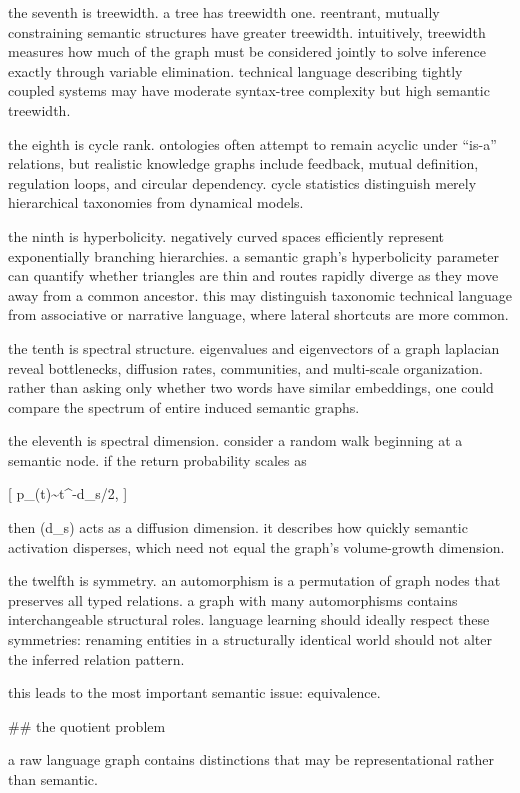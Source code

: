 the seventh is treewidth. a tree has treewidth one. reentrant, mutually constraining semantic structures have greater treewidth. intuitively, treewidth measures how much of the graph must be considered jointly to solve inference exactly through variable elimination. technical language describing tightly coupled systems may have moderate syntax-tree complexity but high semantic treewidth.

the eighth is cycle rank. ontologies often attempt to remain acyclic under “is-a” relations, but realistic knowledge graphs include feedback, mutual definition, regulation loops, and circular dependency. cycle statistics distinguish merely hierarchical taxonomies from dynamical models.

the ninth is hyperbolicity. negatively curved spaces efficiently represent exponentially branching hierarchies. a semantic graph’s hyperbolicity parameter can quantify whether triangles are thin and routes rapidly diverge as they move away from a common ancestor. this may distinguish taxonomic technical language from associative or narrative language, where lateral shortcuts are more common.

the tenth is spectral structure. eigenvalues and eigenvectors of a graph laplacian reveal bottlenecks, diffusion rates, communities, and multi-scale organization. rather than asking only whether two words have similar embeddings, one could compare the spectrum of entire induced semantic graphs.

the eleventh is spectral dimension. consider a random walk beginning at a semantic node. if the return probability scales as

[
p_{}(t)\sim t^{-d_s/2},
]

then (d_s) acts as a diffusion dimension. it describes how quickly semantic activation disperses, which need not equal the graph’s volume-growth dimension.

the twelfth is symmetry. an automorphism is a permutation of graph nodes that preserves all typed relations. a graph with many automorphisms contains interchangeable structural roles. language learning should ideally respect these symmetries: renaming entities in a structurally identical world should not alter the inferred relation pattern.

this leads to the most important semantic issue: equivalence.

## the quotient problem

a raw language graph contains distinctions that may be representational rather than semantic.

